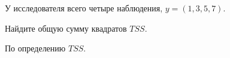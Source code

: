 
\begin{question}
У исследователя всего четыре наблюдения, \(y= (1, 3, 5, 7)\).

Найдите общую сумму квадратов \(TSS\).
\end{question}

\begin{solution}
По определению \(TSS\).
\end{solution}

